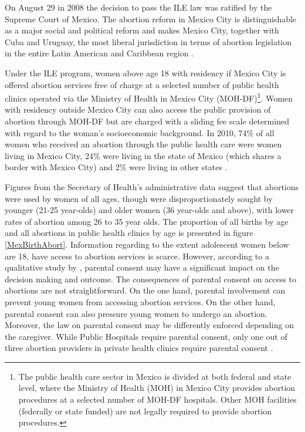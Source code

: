 \documentclass[a4paper,11pt]{article}
\begin{document}
\begin{spacing}{1.5}
On August 29 in 2008 the decision to pass the ILE law was ratified by the Supreme Court of Mexico. The abortion reform in Mexico City is distinguishable as a major social and political reform and makes Mexico City, together with Cuba and Uruguay, the most liberal jurisdiction in terms of abortion legislation in the entire Latin American and Caribbean region \citep{Fraser2015}.

Under the ILE program, women above age 18 with residency if Mexico City is offered abortion services free of charge at a selected number of public health clinics operated via the Ministry of Health in Mexico City (MOH-DF)\footnote{The public health care sector in Mexico is divided at both federal and state level, where the Ministry of Health (MOH) in Mexico City provides abortion procedures at a selected number of MOH-DF hospitals. Other MOH facilities (federally or state funded) are not legally required to provide abortion procedures.}.  Women with residency outside Mexico City can also access the public provision of abortion through MOH-DF but are charged with a sliding fee scale determined with regard to the woman's socioeconomic background. In 2010, 74\% of all women who received an abortion through the public health care were women living in Mexico City, 24\% were living in the state of Mexico (which shares a border with Mexico City) and 2\% were living in other states \citep{Kalb}.

Figures from the Secretary of Health's administrative data suggest that abortions were used by women of all ages, though were disproportionately sought by younger (21-25 year-olds) and older women (36 year-olds and above), with lower rates of abortion among 26 to 35 year olds.  The proportion of all births by age and all abortions in public health clinics by age is presented in figure \ref{MexBirthAbort}. Information regarding to the extent adolescent women below are 18, have access to abortion services is scarce. However, according to a qualitative study by \cite{tatum2012decisionmaking}, parental consent may have a significant impact on the decision making and outcome. The consequences of parental consent on access to abortions are not straightforward. On the one hand, parental involvement can prevent young women from accessing abortion services. On the other hand, parental consent can also pressure young women to undergo an abortion. Moreover, the law on parental consent may be differently enforced depending on the caregiver. While Public Hospitals require parental consent, only one out of three abortion providers in private health clinics require parental consent \citep{Schiavonetal2010}.


\end{spacing}
\end{document}
